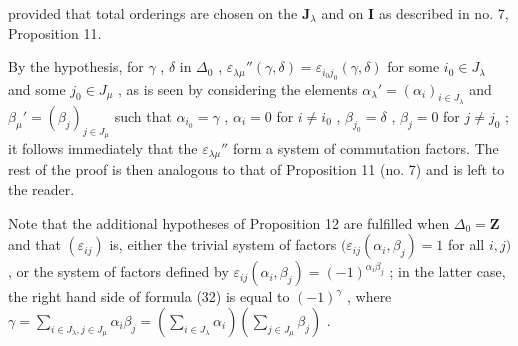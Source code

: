 provided that total orderings are chosen on the \(\mathbf{J}_{\lambda}\) and on \(\mathbf{I}\) as described in no. 7, Proposition 11.

By the hypothesis, for \(\gamma\) , \(\delta\) in \(\Delta_0\) , \(\varepsilon_{\lambda \mu}''(\gamma, \delta) = \varepsilon_{i_0 j_0}(\gamma, \delta)\) for some \(i_0 \in J_\lambda\) and some \(j_0 \in J_\mu\) , as is seen by considering the elements \(\alpha_\lambda' = (\alpha_i)_{i \in J_\lambda}\) and \(\beta_\mu' = (\beta_j)_{j \in J_\mu}\) such that \(\alpha_{i_0} = \gamma\) , \(\alpha_i = 0\) for \(i \neq i_0\) , \(\beta_{j_0} = \delta\) , \(\beta_j = 0\) for \(j \neq j_0\) ; it follows immediately that the \(\varepsilon_{\lambda \mu}''\) form a system of commutation factors. The rest of the proof is then analogous to that of Proposition 11 (no. 7) and is left to the reader.

Note that the additional hypotheses of Proposition 12 are fulfilled when \(\Delta_0 = \mathbf{Z}\) and that \((\varepsilon_{ij})\) is, either the trivial system of factors \((\varepsilon_{ij}(\alpha_i,\beta_j) = 1\) for all \(i,j)\) , or the system of factors defined by \(\varepsilon_{ij}(\alpha_i,\beta_j) = (-1)^{\alpha_i\beta_j}\) ; in the latter case, the right hand side of formula (32) is equal to \((-1)^{\gamma}\) , where \(\gamma = \sum_{i\in J_{\lambda},j\in J_{\mu}}\alpha_{i}\beta_{j} = \left(\sum_{i\in J_{\lambda}}\alpha_{i}\right)\left(\sum_{j\in J_{\mu}}\beta_{j}\right)\) .

